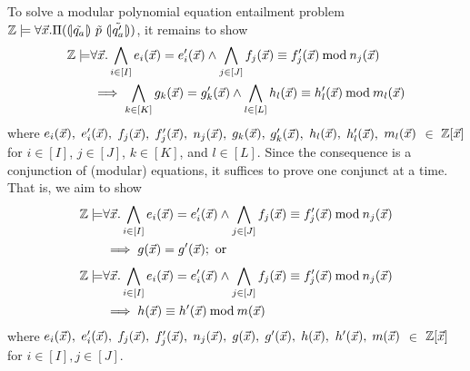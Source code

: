 
To solve a modular polynomial equation entailment problem $\mathbb{Z} \models \forall \vec{x}. \Pi ({(\!|}{\tilde{q_a}}{|\!)}~{\tilde{p}}~{(\!|}{\tilde{q_a'}}{|\!)})$, it remains to show
\begin{equation*}
\begin{aligned}
  \bbfZ \models & \forall \vx. %
  \bigwedge\limits_{i \in [I]} e_i (\vx) = e'_i (\vx) \wedge
  \bigwedge\limits_{j \in [J]} f_j (\vx) \equiv f'_j (\vx) \mod n_j(\vx) \\
  & \implies
  \bigwedge\limits_{k \in [K]} g_k (\vx) = g'_k (\vx) \wedge
  \bigwedge\limits_{l \in [L]} h_l (\vx) \equiv h'_l (\vx) \mod m_l(\vx)
\end{aligned}
\end{equation*}
where
$e_i (\vec{x}),$ $e'_i (\vec{x}),$ $f_j (\vec{x}),$ $f'_j (\vec{x}),$ $n_j(\vec{x}),$
$g_k (\vec{x}),$ $g'_k (\vec{x}),$ $h_l (\vec{x}),$ $h'_l (\vec{x}),$ $m_l(\vec{x})$ $\in$
 $\mathbb{Z}[\vec{x}]$ for $i \in [I]$, $j \in [J]$, $k
 \in [K]$, and $l \in [L]$. Since the
consequence is a conjunction of (modular) equations, it suffices to
prove one conjunct at a time. That is, we aim to show
\begin{equation*}
\begin{aligned}
  \label{eq:polynomial-equation-implicant}
  \bbfZ \models & \forall \vx. %
  \bigwedge\limits_{i \in [I]} e_i (\vx) = e'_i (\vx) \wedge
  \bigwedge\limits_{j \in [J]} f_j (\vx) \equiv f'_j (\vx) \mod n_j (\vx) \\
  & \implies
  g (\vx) = g' (\vx); \textmd{ or}
\end{aligned}
\end{equation*}
\begin{equation*}
\begin{aligned}
   \label{eq:modular-polynomial-equation-implicant}
   \bbfZ \models & \forall \vx. %
   \bigwedge\limits_{i \in [I]} e_i (\vx) = e'_i (\vx) \wedge
   \bigwedge\limits_{j \in [J]} f_j (\vx) \equiv f'_j (\vx) \mod n_j (\vx) \\
   & \implies
   h (\vx) \equiv h' (\vx) \mod m (\vx)
\end{aligned}
\end{equation*}
where $e_i (\vec{x}),$ $e'_i (\vec{x}),$ $f_j (\vec{x}),$ $f'_j (\vec{x}),$ $n_j (\vec{x}),$ $g (\vec{x}),$ $g' (\vec{x}),$
$h (\vec{x}),$ $h' (\vec{x}),$ $m(\vec{x})$ $\in$ $\mathbb{Z}[\vec{x}]$ for $i \in [I], j \in [J]$.

